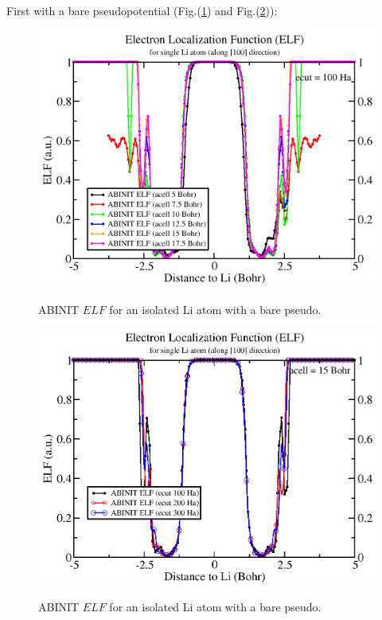\documentclass[a4paper,12pt]{report}
\begin{document}
First with a bare pseudopotential (Fig.(\ref{fig3}) and Fig.(\ref{fig4})):

\begin{figure}[!h]
\centering
\begin{minipage}[c]{1.0\textwidth}
\includegraphics[width = \textwidth]{fig3}
\end{minipage}
\vspace{0.12\textwidth}
\begin{minipage}[c]{0.8\textwidth}
\caption{\small ABINIT $ELF$ for an isolated Li atom with a bare pseudo.}
\vspace*{1.0ex}
\label{fig3}
\end{minipage}
\end{figure}


\begin{figure}[!h]
\centering
\begin{minipage}[c]{1.0\textwidth}
\includegraphics[width = \textwidth]{fig4}
\end{minipage}
\vspace{0.12\textwidth}
\begin{minipage}[c]{0.8\textwidth}
\caption{\small ABINIT $ELF$ for an isolated Li atom with a bare pseudo.}
\vspace*{1.0ex}
\label{fig4}
\end{minipage}
\end{figure}
\end{document}

